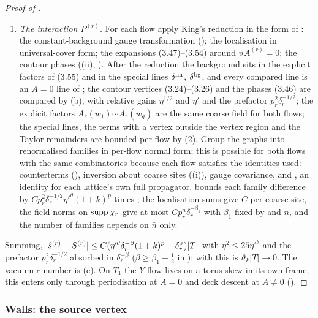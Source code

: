 \begin{proof}[Proof of ]
\begin{enumerate}[leftmargin=*]
\item \emph{The interaction $P^{(r)}$.} For each flow apply King's reduction \cite[(3.43)--(3.57)]{K1} in the form of : the constant-background gauge transformation (); the localisation in universal-cover form; the expansions (3.47)--(3.54) around $\vartheta A^{(r)}=0$; the contour phases ((ii), ). After the reduction the background sits in the explicit factors of (3.55) and in the special lines $\delta^{\rm im}$, $\delta^{\rm bg}$, and every compared line is an $A=0$ line of ; the contour vertices (3.24)--(3.26) and the phases (3.46) are compared by (b), with relative gains $\eta^{1/2}$ and $\eta'$ and the prefactor $p_r^2\delta_r^{-1/2}$; the explicit factors $A_r(w_1)\cdots A_r(w_q)$ are the same coarse field for both flows; the special lines, the terms with a vertex outside the vertex region and the Taylor remainders are bounded per flow by (2). Group the graphs into renormalised families in per-flow normal form; this is possible for both flows with the same combinatorics because each flow satisfies the identities used: counterterms (), inversion about coarse sites ((i)), gauge covariance, and \cite[(3.87)]{K1}, an identity for each lattice's own full propagator.  bounds each family difference by $Cp_r^2\delta_r^{-1/2}\eta'^{\theta}(1+k)^p$ times \cite[(1.33)]{Ba3}; the localisation sums give $C$ per coarse site, the field norms on $\operatorname{supp}\chi_r$ give at most $Cp_r^{\bar n}\delta_r^{-\beta_1}$ with $\beta_1$ fixed by \cite[(3.2)]{K1} and $\bar n$, and the number of families depends on $\bar n$ only.
\end{enumerate}
Summing, $|\hat s^{(r)}-S^{(r)}|\le C(\eta'^{\theta}\delta_r^{-\beta}(1+k)^p+\delta_r^\sigma)|T|$ with $\eta^2\le25\eta'^\theta$ and the prefactor $p_r^2\delta_r^{-1/2}$ absorbed in $\delta_r^{-\beta}$ ($\beta\ge\beta_1+\frac12$ in ); with  this is $\vartheta_k|T|\to0$. The vacuum $c$-number is (e). On $T_1$ the $Y$-flow lives on a torus skew in its own frame; this enters only through periodisation at $A=0$ and deck descent at $A\ne0$ ().
\end{proof}

\subsubsection*{Walls: the source vertex}

